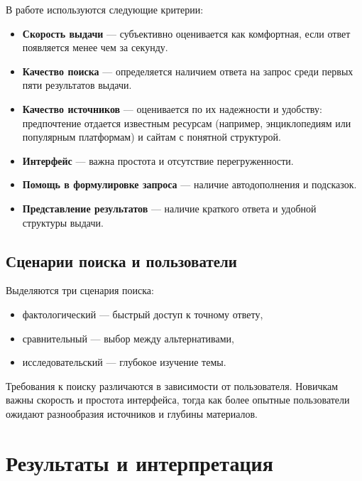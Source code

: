 \documentclass[11pt]{article}
\begin{document}
В работе используются следующие критерии:

\begin{itemize}
    \item \textbf{Скорость выдачи} — субъективно оценивается как комфортная, если
    ответ появляется менее чем за секунду.
    
    \item \textbf{Качество поиска} — определяется наличием ответа на запрос среди
    первых пяти результатов выдачи.
    
    \item \textbf{Качество источников} — оценивается по их надежности и удобству:
    предпочтение отдается известным ресурсам (например, энциклопедиям или
    популярным платформам) и сайтам с понятной структурой.
    
    \item \textbf{Интерфейс} — важна простота и отсутствие перегруженности.
    
    \item \textbf{Помощь в формулировке запроса} — наличие автодополнения и подсказок.
    
    \item \textbf{Представление результатов} — наличие краткого ответа и удобной
    структуры выдачи.
\end{itemize}

\subsection{Сценарии поиска и пользователи}

Выделяются три сценария поиска:

\begin{itemize}
    \item фактологический — быстрый доступ к точному ответу,
    \item сравнительный — выбор между альтернативами,
    \item исследовательский — глубокое изучение темы.
\end{itemize}

Требования к поиску различаются в зависимости от пользователя. Новичкам важны
скорость и простота интерфейса, тогда как более опытные пользователи ожидают
разнообразия источников и глубины материалов.

\section{Результаты и интерпретация}
\end{document}
